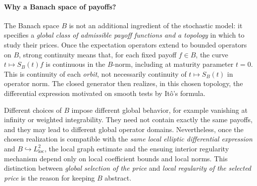 \documentclass[11pt,a4paper]{article}
\theoremstyle{definition}\newtheorem{definition}{Definition}[section]\newtheorem{example}[theorem]{Example}
\theoremstyle{remark}\newtheorem{remark}[theorem]{Remark}\newtheorem{remarkSix}{Remark}[section]
\newcommand{\loc}{\mathrm{loc}}
\begin{document}
\paragraph{Why a Banach space of payoffs?}
The Banach space $B$ is not an additional ingredient of the stochastic model: it specifies a \emph{global class of admissible payoff functions and a topology} in which to study their prices.  Once the expectation operators extend to bounded operators on $B$, strong continuity means that, for each fixed payoff $f\in B$, the curve $t\mapsto S_B(t)f$ is continuous in the $B$-norm, including at maturity parameter $t=0$.  This is continuity of each \emph{orbit}, not necessarily continuity of $t\mapsto S_B(t)$ in operator norm.  The closed generator then realizes, in this chosen topology, the differential expression motivated on smooth tests by It\^o's formula.

Different choices of $B$ impose different global behavior, for example vanishing at infinity or weighted integrability.  They need not contain exactly the same payoffs, and they may lead to different global operator domains.  Nevertheless, once the chosen realization is compatible with the \emph{same local elliptic differential expression} and $B\hookrightarrow L^2_{\loc}$, the local graph estimate and the ensuing interior regularity mechanism depend only on local coefficient bounds and local norms.  This distinction between \emph{global selection of the price} and \emph{local regularity of the selected price} is the reason for keeping $B$ abstract.
\end{document}
